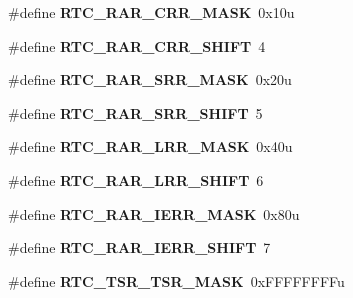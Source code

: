 \begin{DoxyCompactItemize}
\item 
\#define {\bfseries R\+T\+C\+\_\+\+R\+A\+R\+\_\+\+C\+R\+R\+\_\+\+M\+A\+SK}~0x10u\hypertarget{group__RTC__Register__Masks_gad35d06502770fe19b836353c9e77c8d1}{}\label{group__RTC__Register__Masks_gad35d06502770fe19b836353c9e77c8d1}

\item 
\#define {\bfseries R\+T\+C\+\_\+\+R\+A\+R\+\_\+\+C\+R\+R\+\_\+\+S\+H\+I\+FT}~4\hypertarget{group__RTC__Register__Masks_gab184f1269ead4310ffb856ec7fb43171}{}\label{group__RTC__Register__Masks_gab184f1269ead4310ffb856ec7fb43171}

\item 
\#define {\bfseries R\+T\+C\+\_\+\+R\+A\+R\+\_\+\+S\+R\+R\+\_\+\+M\+A\+SK}~0x20u\hypertarget{group__RTC__Register__Masks_gae53f1b7345f96a9c760070c09cb681d9}{}\label{group__RTC__Register__Masks_gae53f1b7345f96a9c760070c09cb681d9}

\item 
\#define {\bfseries R\+T\+C\+\_\+\+R\+A\+R\+\_\+\+S\+R\+R\+\_\+\+S\+H\+I\+FT}~5\hypertarget{group__RTC__Register__Masks_ga23133dd504a3ee1f1e44adb432cb961a}{}\label{group__RTC__Register__Masks_ga23133dd504a3ee1f1e44adb432cb961a}

\item 
\#define {\bfseries R\+T\+C\+\_\+\+R\+A\+R\+\_\+\+L\+R\+R\+\_\+\+M\+A\+SK}~0x40u\hypertarget{group__RTC__Register__Masks_ga3ff3b63507d843cbf0c4738aea636510}{}\label{group__RTC__Register__Masks_ga3ff3b63507d843cbf0c4738aea636510}

\item 
\#define {\bfseries R\+T\+C\+\_\+\+R\+A\+R\+\_\+\+L\+R\+R\+\_\+\+S\+H\+I\+FT}~6\hypertarget{group__RTC__Register__Masks_gab21813ba6c73f55e69563b0fcfbd0d73}{}\label{group__RTC__Register__Masks_gab21813ba6c73f55e69563b0fcfbd0d73}

\item 
\#define {\bfseries R\+T\+C\+\_\+\+R\+A\+R\+\_\+\+I\+E\+R\+R\+\_\+\+M\+A\+SK}~0x80u\hypertarget{group__RTC__Register__Masks_ga000c148fd3ee9bfbe8f5a96edb4f395d}{}\label{group__RTC__Register__Masks_ga000c148fd3ee9bfbe8f5a96edb4f395d}

\item 
\#define {\bfseries R\+T\+C\+\_\+\+R\+A\+R\+\_\+\+I\+E\+R\+R\+\_\+\+S\+H\+I\+FT}~7\hypertarget{group__RTC__Register__Masks_gaf3ac1fe81dcd5b54cfe9d8d2125345aa}{}\label{group__RTC__Register__Masks_gaf3ac1fe81dcd5b54cfe9d8d2125345aa}

\item 
\#define {\bfseries R\+T\+C\+\_\+\+T\+S\+R\+\_\+\+T\+S\+R\+\_\+\+M\+A\+SK}~0x\+F\+F\+F\+F\+F\+F\+F\+Fu\hypertarget{group__RTC__Register__Masks_ga9a0f8842e8262ca176fcf028982153af}{}\label{group__RTC__Register__Masks_ga9a0f8842e8262ca176fcf028982153af}


\end{DoxyCompactItemize}
